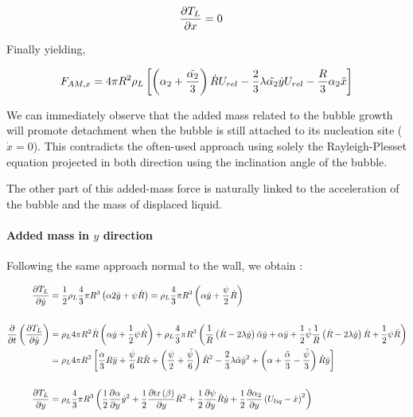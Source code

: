 \begin{align}
\frac{\partial T_{L}}{\partial x}&=0
\end{align}


Finally yielding, 

\begin{align}
F_{AM,x}=4\pi R^{2}\rho_{L} \left[ \left( \alpha_{2}+\frac{\tilde{\alpha_{2}}}{3} \right)\dot{R}U_{rel}-\frac{2}{3}\lambda \tilde{\alpha_{2}}\dot{y}U_{rel}-\frac{R}{3}\alpha_{2}\ddot{x}  \right]
\end{align}

We can immediately observe that the added mass related to the bubble growth will promote detachment when the bubble is still attached to its nucleation site ($\dot{x}=0$). This contradicts the often-used approach using solely the Rayleigh-Plesset equation projected in both direction using the inclination angle of the bubble. 

The other part of this added-mass force is naturally linked to the acceleration of the bubble and the mass of displaced liquid. 


\paragraph{Added mass in $y$ direction}

Following the same approach normal to the wall, we obtain : 

\begin{align}
\frac{\partial T_{L}}{\partial \dot{y}}&=\frac{1}{2}\rho_{L}\frac{4}{3}\pi R^{3}\left( \alpha 2\dot{y}+\psi\dot{R} \right)=\rho_{L}\frac{4}{3}\pi R^{3}\left( \alpha \dot{y} + \frac{\psi}{2}\dot{R} \right)\\
\nonumber \\
\frac{\partial }{\partial t}\left( \frac{\partial T_{L}}{\partial \dot{y}} \right)&=\rho_{L}4\pi R^{2}\dot{R}\left( \alpha \dot{y} + \frac{1}{2} \psi \dot{R} \right)+\rho_{L}\frac{4}{3}\pi R^{3}\left( \frac{1}{R}\left( \dot{R}-2\lambda \dot{y} \right)\tilde{\alpha}\dot{y} +\alpha\ddot{y}+\frac{1}{2}\tilde{\psi}\frac{1}{R}\left( \dot{R}-2\lambda \dot{y} \right)\dot{R} +\frac{1}{2}\psi \ddot{R} \right)\\
&=\rho_{L}4\pi R^{2}\left[ \frac{\alpha}{3}R\ddot{y}+\frac{\psi}{6}R \ddot{R} + \left( \frac{\psi}{2} +\frac{\tilde{\psi}}{6} \right)\dot{R}^{2} -\frac{2}{3}\lambda \tilde{\alpha} \dot{y}^{2} + \left(  \alpha + \frac{\tilde{\alpha}}{3} - \frac{\tilde{\psi}}{3}  \right)\dot{R}\dot{y}  \right]\\
\nonumber \\
\frac{\partial T_{L}}{\partial y}&=\rho_{L}\frac{4}{3}\pi R^{3} \left(  \frac{1}{2} \frac{\partial \alpha}{\partial y}\dot{y}^{2} + \frac{1}{2} \frac{\partial \mathrm{tr}\left( \beta \right)}{\partial y}\dot{R}^{2}+\frac{1}{2}\frac{\partial \psi}{\partial y}\dot{R}\dot{y}+\frac{1}{2}\frac{\partial \alpha_{2}}{\partial y}\left( U_{liq}-\dot{x} \right)^{2}  \right) 
\end{align}

